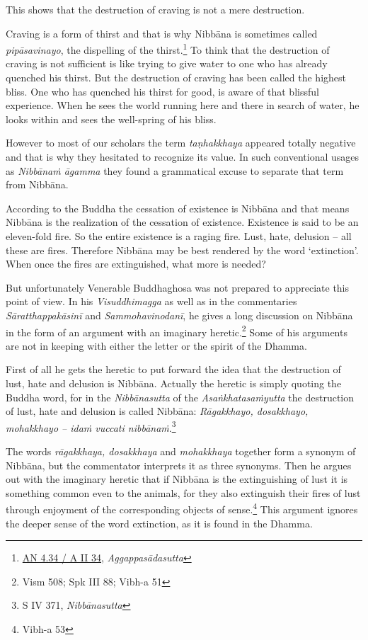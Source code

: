 This shows that the destruction of craving is not a mere destruction.

Craving is a form of thirst and that is why Nibbāna is sometimes called \emph{pipāsavinayo}, the dispelling of the thirst.\footnote{\href{https://suttacentral.net/an4.34/pli/ms}{AN 4.34 / A II 34}, \emph{Aggappasādasutta}} To think that the destruction of craving is not sufficient is like trying to give water to one who has already quenched his thirst. But the destruction of craving has been called the highest bliss. One who has quenched his thirst for good, is aware of that blissful experience. When he sees the world running here and there in search of water, he looks within and sees the well-spring of his bliss.

However to most of our scholars the term \emph{taṇhakkhaya} appeared totally negative and that is why they hesitated to recognize its value. In such conventional usages as \emph{Nibbānaṁ āgamma} they found a grammatical excuse to separate that term from Nibbāna.

According to the Buddha the cessation of existence is Nibbāna and that means Nibbāna is the realization of the cessation of existence. Existence is said to be an eleven-fold fire. So the entire existence is a raging fire. Lust, hate, delusion -- all these are fires. Therefore Nibbāna may be best rendered by the word `extinction'. When once the fires are extinguished, what more is needed?

But unfortunately Venerable Buddhaghosa was not prepared to appreciate this point of view. In his \emph{Visuddhimagga} as well as in the commentaries \emph{Sāratthappakāsinī} and \emph{Sammohavinodanī}, he gives a long discussion on Nibbāna in the form of an argument with an imaginary heretic.\footnote{Vism 508; Spk III 88; Vibh-a 51} Some of his arguments are not in keeping with either the letter or the spirit of the Dhamma.

First of all he gets the heretic to put forward the idea that the destruction of lust, hate and delusion is Nibbāna. Actually the heretic is simply quoting the Buddha word, for in the \emph{Nibbānasutta} of the \emph{Asaṅkhatasaṁyutta} the destruction of lust, hate and delusion is called Nibbāna: \emph{Rāgakkhayo, dosakkhayo, mohakkhayo -- idaṁ vuccati nibbānaṁ}.\footnote{S IV 371, \emph{Nibbānasutta}}

The words \emph{rāgakkhaya, dosakkhaya} and \emph{mohakkhaya} together form a synonym of Nibbāna, but the commentator interprets it as three synonyms. Then he argues out with the imaginary heretic that if Nibbāna is the extinguishing of lust it is something common even to the animals, for they also extinguish their fires of lust through enjoyment of the corresponding objects of sense.\footnote{Vibh-a 53} This argument ignores the deeper sense of the word extinction, as it is found in the Dhamma.

